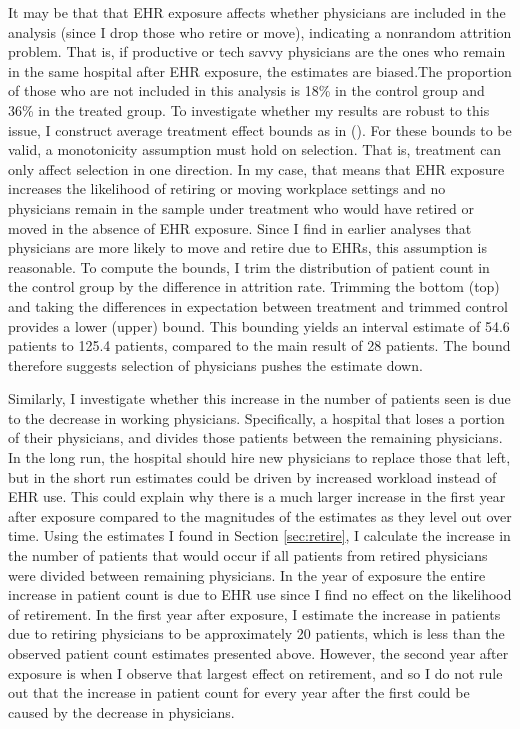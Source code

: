 \documentclass[12pt]{article}
\begin{document}
It may be that that EHR exposure affects whether physicians are included in the analysis (since I drop those who retire or move), indicating a nonrandom attrition problem. That is, if productive or tech savvy physicians are the ones who remain in the same hospital after EHR exposure, the estimates are biased.The proportion of those who are not included in this analysis is 18\% in the control group and 36\% in the treated group. To investigate whether my results are robust to this issue, I construct average treatment effect bounds as in  \citeauthor{lee2009training} (\citeyear{lee2009training}). For these bounds to be valid, a monotonicity assumption must hold on selection. That is, treatment can only affect selection in one direction. In my case, that means that EHR exposure increases the likelihood of retiring or moving workplace settings and no physicians remain in the sample under treatment who would have retired or moved in the absence of EHR exposure. Since I find in earlier analyses that physicians are more likely to move and retire due to EHRs, this assumption is reasonable. To compute the bounds, I trim the distribution of patient count in the control group by the difference in attrition rate. Trimming the bottom (top) and taking the differences in expectation between treatment and trimmed control provides a lower (upper) bound. This bounding yields an interval estimate of 54.6 patients to 125.4 patients, compared to the main result of 28 patients. The bound therefore suggests selection of physicians pushes the estimate down.

Similarly, I investigate whether this increase in the number of patients seen is due to the decrease in working physicians. Specifically, a hospital that loses a portion of their physicians, and divides those patients between the remaining physicians. In the long run, the hospital should hire new physicians to replace those that left, but in the short run estimates could be driven by increased workload instead of EHR use. This could explain why there is a much larger increase in the first year after exposure compared to the magnitudes of the estimates as they level out over time. Using the estimates I found in Section \ref{sec:retire}, I calculate the increase in the number of patients that would occur if all patients from retired physicians were divided between remaining physicians. In the year of exposure the entire increase in patient count is due to EHR use since I find no effect on the likelihood of retirement. In the first year after exposure, I estimate the increase in patients due to retiring physicians to be approximately 20 patients, which is less than the observed patient count estimates presented above. However, the second year after exposure is when I observe that largest effect on retirement, and so I do not rule out that the increase in patient count for every year after the first could be caused by the decrease in physicians. 
\end{document}
